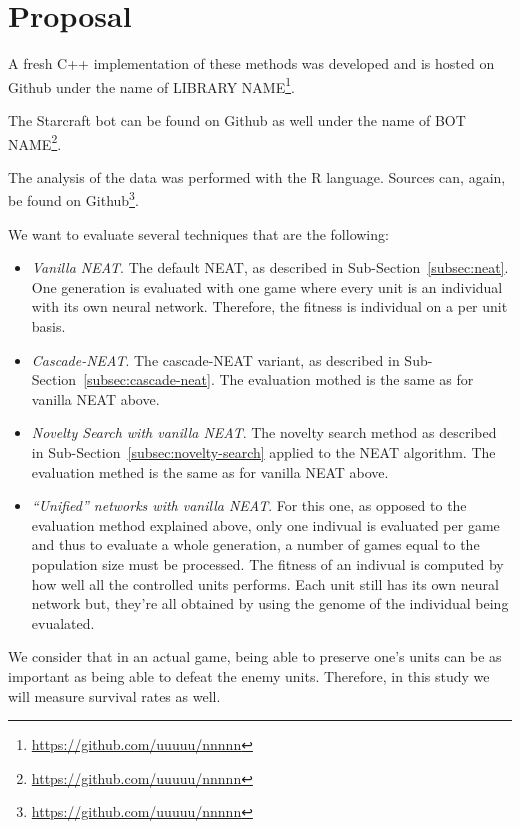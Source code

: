 \section{Proposal}\label{section:proposal}

A fresh C++ implementation of these methods was developed and is
hosted on Github under the name of LIBRARY
NAME\footnote{\url{https://github.com/uuuuu/nnnnn}}.%

The Starcraft bot can be found on Github as well under the name of BOT
NAME\footnote{\url{https://github.com/uuuuu/nnnnn}}.%

The analysis of the data was performed with the R language. Sources
can, again, be found on
Github\footnote{\url{https://github.com/uuuuu/nnnnn}}.%

We want to evaluate several techniques that are the following:
\begin{itemize}
    \item \emph{Vanilla NEAT}. The default NEAT, as described in
      Sub-Section~\ref{subsec:neat}. One generation is evaluated with
      one game where every unit is an individual with its own neural
      network. Therefore, the fitness is individual on a per unit
      basis.
    \item \emph{Cascade-NEAT}. The cascade-NEAT variant, as described
      in Sub-Section~\ref{subsec:cascade-neat}.  The evaluation mothed
      is the same as for vanilla NEAT above.
    \item \emph{Novelty Search with vanilla NEAT}. The novelty search
      method as described in Sub-Section~\ref{subsec:novelty-search}
      applied to the NEAT algorithm.  The evaluation methed is the
      same as for vanilla NEAT above.
    \item \emph{``Unified'' networks with vanilla NEAT}. For this one,
      as opposed to the evaluation method explained above, only one
      indivual is evaluated per game and thus to evaluate a whole
      generation, a number of games equal to the population size must
      be processed.  The fitness of an indivual is computed by how
      well all the controlled units performs. Each unit still has its
      own neural network but, they're all obtained by using the genome
      of the individual being evualated.
\end{itemize}

We consider that in an actual game, being able to preserve one's units
can be as important as being able to defeat the enemy units.
Therefore, in this study we will measure survival rates as well.

